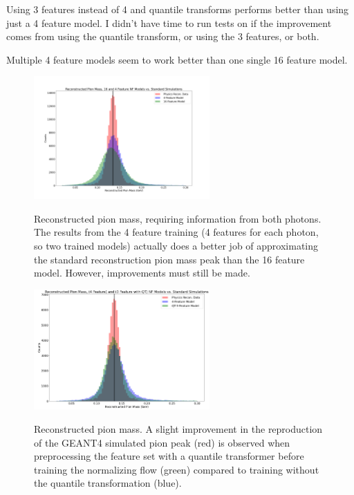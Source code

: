 Using 3 features instead of 4 and quantile transforms performs better than using just a 4 feature model. I didn't have time to run tests on if the improvement comes from using the quantile transform, or using the 3 features, or both.


Multiple 4 feature models seem to work better than one single 16 feature model.

\begin{figure}[htb]
\centering
\includegraphics[width = 0.6\textwidth]{Chapters/Ch3-Simulations/normalizing_flows/pics/MeetingFigures/Bobby/Reconstructed_Pion_Mass,_16_and_4_Feature_NF_Models_vs_Standard_Simulations.png}
\label{fig: jul8_pion_comparison5}
\caption[Placeholder Short text]{Reconstructed pion mass, requiring information from both photons. The results from the 4 feature training (4 features for each photon, so two trained models) actually does a better job of approximating the standard reconstruction pion mass peak than the 16 feature model. However, improvements must still be made. }
\end{figure}


\begin{figure}[htb]
\centering
\includegraphics[width = 0.6\textwidth]{Chapters/Ch3-Simulations/normalizing_flows/pics/MeetingFigures/Bobby/qt-3-4.png}
\label{fig: jul8_pion_comparison}
\caption[Placeholder Short text]{Reconstructed pion mass. A slight improvement in the reproduction of the GEANT4 simulated pion peak (red) is observed when preprocessing the feature set with a quantile transformer before training the normalizing flow (green) compared to training without the quantile transformation (blue). }
\end{figure}





